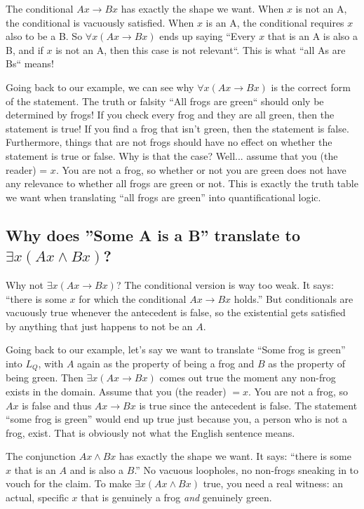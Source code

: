 \documentclass[11pt]{article}
\begin{document}
The conditional $Ax \to Bx$ has exactly the shape we want. When $x$ is not an A, the conditional is vacuously satisfied. When $x$ is an A, the conditional requires $x$ also to be a B. So $\forall x(Ax \to Bx)$ ends up saying ``Every $x$ that is an A is also a B, and if $x$ is not an A, then this case is not relevant``. This is what ``all As are Bs`` means!

Going back to our example, we can see why $\forall x(Ax \to Bx)$ is the correct form of the statement. The truth or falsity ``All frogs are green`` should only be determined by frogs! If you check every frog and they are all green, then the statement is true! If you find a frog that isn't green, then the statement is false. Furthermore, things that are not frogs should have no effect on whether the statement is true or false. Why is that the case? Well... assume that you (the reader) = $x$. You are not a frog, so whether or not you are green does not have any relevance to whether all frogs are green or not. This is exactly the truth table we want when translating ``all frogs are green'' into quantificational logic.

\subsection*{Why does ''Some A is a B'' translate to $\exists x(Ax \wedge Bx)$?}
Why not $\exists x(Ax \to Bx)$? The conditional version is way too weak. It says: ``there is some $x$ for which the conditional $Ax \to Bx$ holds.'' But conditionals are vacuously true whenever the antecedent is false, so the existential gets satisfied by anything that just happens to not be an $A$.

Going back to our example, let's say we want to translate ``Some frog is green'' into $L_Q$, with $A$ again as the property of being a frog and $B$ as the property of being green. Then $\exists x(Ax \to Bx)$ comes out true the moment any non-frog exists in the domain. Assume that you (the reader) $= x$. You are not a frog, so $Ax$ is false and thus $Ax \to Bx$ is true since the antecedent is false. The statement ``some frog is green'' would end up true just because you, a person who is not a frog, exist. That is obviously not what the English sentence means.

The conjunction $Ax \wedge Bx$ has exactly the shape we want. It says: ``there is some $x$ that is an $A$ and is also a $B$.'' No vacuous loopholes, no non-frogs sneaking in to vouch for the claim. To make $\exists x(Ax \wedge Bx)$ true, you need a real witness: an actual, specific $x$ that is genuinely a frog \emph{and} genuinely green.
\end{document}
